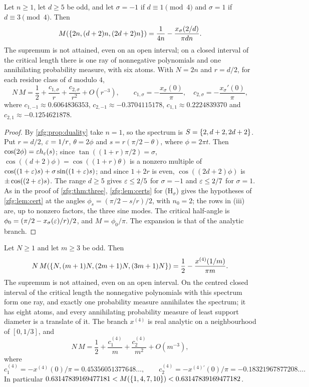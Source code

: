 \begin{theorem}\label{zfg:thm:half}
Let $n\ge1$, let $d\ge5$ be odd, and let $\sigma=-1$ if $d\equiv1\pmod4$ and $\sigma=1$ if $d\equiv3\pmod4$. Then
\[
 M(\{2n,(d+2)n,(2d+2)n\})=\frac1{4n}-\frac{x_\sigma(2/d)}{\pi dn}.
\]
The supremum is not attained, even on an open interval; on a closed interval of the critical length there is one ray
of nonnegative polynomials and one annihilating probability measure, with six atoms. With $N=2n$ and $r=d/2$, for
each residue class of $d$ modulo $4$,
\[
 N\,M=\frac12+\frac{c_{1,\sigma}}r+\frac{c_{2,\sigma}}{r^2}+O(r^{-3}),\qquad c_{1,\sigma}=-\frac{x_\sigma(0)}\pi,\quad c_{2,\sigma}=-\frac{x_\sigma'(0)}\pi,
\]
where $c_{1,-1}\approx0.6064836353$, $c_{2,-1}\approx-0.3704115178$, $c_{1,1}\approx0.2224839370$ and $c_{2,1}\approx-0.1254621878$.
\end{theorem}

\begin{proof}
By \cref{zfg:prop:duality} take $n=1$, so the spectrum is $S=\{2,d+2,2d+2\}$. Put $r=d/2$, $\varepsilon=1/r$, $\theta=2\phi$ and
$s=r(\pi/2-\theta)$, where $\phi=2\pi t$. Then $\cos(2\phi)=\varepsilon h_\varepsilon(s)$; since $\tan((1+r)\pi/2)=\sigma$, $\cos((d+2)\phi)=\cos((1+r)\theta)$ is a
nonzero multiple of $\cos((1+\varepsilon)s)+\sigma\sin((1+\varepsilon)s)$; and since $1+2r$ is even, $\cos((2d+2)\phi)$ is $\pm\cos((2+\varepsilon)s)$. The
range $d\ge5$ gives $\varepsilon\le2/5$ for $\sigma=-1$ and $\varepsilon\le2/7$ for $\sigma=1$. As in the proof of \cref{zfg:thm:three},
\cref{zfg:lem:certs} for (H$_\sigma$) gives the hypotheses of \cref{zfg:lem:cert} at the angles $\phi_s=(\pi/2-s/r)/2$, with
$n_0=2$; the rows in (iii) are, up to nonzero factors, the three sine modes. The critical half-angle is
$\phi_0=(\pi/2-x_\sigma(\varepsilon)/r)/2$, and $M=\phi_0/\pi$. The expansion is that of the analytic branch.
\end{proof}

\begin{theorem}\label{zfg:thm:four}
Let $N\ge1$ and let $m\ge3$ be odd. Then
\[
 N\,M(\{N,(m+1)N,(2m+1)N,(3m+1)N\})=\frac12-\frac{x^{(4)}(1/m)}{\pi m}.
\]
The supremum is not attained, even on an open interval. On the centred closed interval of the critical length the
nonnegative polynomials with this spectrum form one ray, and exactly one probability measure annihilates the spectrum;
it has eight atoms, and every annihilating probability measure of least support diameter is a translate of it. The
branch $x^{(4)}$ is real analytic on a neighbourhood of $[0,1/3]$, and
\[
 N\,M=\frac12+\frac{c_1^{(4)}}m+\frac{c_2^{(4)}}{m^2}+O(m^{-3}),
\]
where
\[
 c_1^{(4)}=-x^{(4)}(0)/\pi=0.45356051377648\ldots,\qquad c_2^{(4)}=-x^{(4)\prime}(0)/\pi=-0.18321967877208\ldots.
\]
In particular $0.63147839169477181<M(\{1,4,7,10\})<0.63147839169477182$.
\end{theorem}

